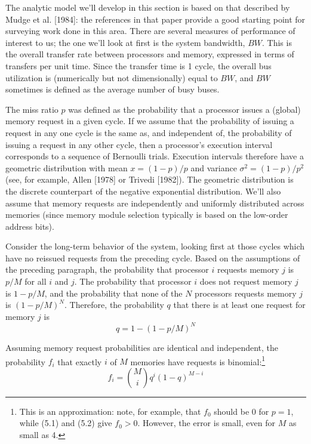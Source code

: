 The analytic model we'll develop in this section is based on that
described by Mudge et al. [1984]: the references in that paper provide a good
starting point for surveying work done in this area. There are several
measures of performance of interest to us; the one we'll look at first is the
system bandwidth, $BW$. This is the overall transfer rate between processors
and memory, expressed in terms of transfers per unit time. Since the transfer
time is 1 cycle, the overall bus utilization is (numerically but not
dimensionally) equal to $BW$, and $BW$ sometimes is defined as the average
number of busy buses.

The miss ratio $p$ was defined as the probability that a processor issues a
(global) memory request in a given cycle. If we assume that the probability
of issuing a request in any one cycle is the same as, and independent of, the
probability of issuing a request in any other cycle, then a processor's
execution interval corresponds to a sequence of Bernoulli trials. Execution
intervals therefore have a geometric distribution with mean $x=(1-p)/p$
and variance $\sigma^2=(1-p)/p^2$ (see, for example, Allen [1978] or Trivedi
[1982]). The geometric distribution is the discrete counterpart of the negative
exponential distribution. We'll also assume that memory requests are
independently and uniformly distributed across memories (since memory module
selection typically is based on the low-order address bits).

Consider the long-term behavior of the system, looking first at those
cycles which have no reissued requests from the preceding cycle. Based on
the assumptions of the preceding paragraph, the probability that processor $i$
requests memory $j$ is $p/M$ for all $i$ and $j$. The probability that processor $i$ does
not request memory $j$ is $1-p/M$, and the probability that none of the $N$
processors requests memory $j$ is $(1-p/M)^N$. Therefore, the probability $q$ that
there is at least one request for memory $j$ is
\begin{equation}
q=1-(1-p/M)^N
\label{eq:mp-q-p}
\end{equation}

Assuming memory request probabilities are identical and independent, the
probability $f_i$ that exactly $i$ of $M$ memories have requests is binomial:\footnote{This is an approximation: note, for example, that $f_0$ should be 0 for $p=1$, while (5.1) and (5.2) give $f_0>0$. However, the error is small, even for $M$ as small as 4.}
\begin{equation}
f_i=\binom{M}{i}q^i(1-q)^{M-i}
\label{eq:mp-fi}
\end{equation}

